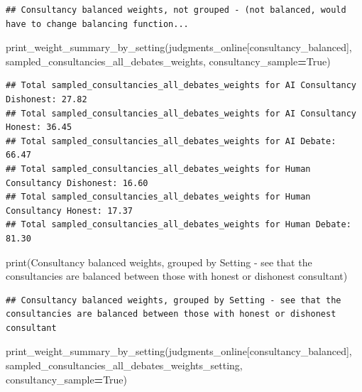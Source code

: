 \documentclass[
]{article}
\newenvironment{Shaded}{\begin{snugshade}}{\end{snugshade}}
\newcommand{\BuiltInTok}[1]{#1}
\newcommand{\NormalTok}[1]{#1}
\newcommand{\OperatorTok}[1]{\textcolor[rgb]{0.81,0.36,0.00}{\textbf{#1}}}
\newcommand{\StringTok}[1]{\textcolor[rgb]{0.31,0.60,0.02}{#1}}
\newcommand{\VariableTok}[1]{\textcolor[rgb]{0.00,0.00,0.00}{#1}}
\begin{document}
\begin{verbatim}
## Consultancy balanced weights, not grouped - (not balanced, would have to change balancing function...
\end{verbatim}

\begin{Shaded}
\begin{Highlighting}[]
\NormalTok{print\_weight\_summary\_by\_setting(judgments\_online[consultancy\_balanced], }\StringTok{\textquotesingle{}sampled\_consultancies\_all\_debates\_weights\textquotesingle{}}\NormalTok{, consultancy\_sample}\OperatorTok{=}\VariableTok{True}\NormalTok{)}
\end{Highlighting}
\end{Shaded}

\begin{verbatim}
## Total sampled_consultancies_all_debates_weights for AI Consultancy Dishonest: 27.82
## Total sampled_consultancies_all_debates_weights for AI Consultancy Honest: 36.45
## Total sampled_consultancies_all_debates_weights for AI Debate: 66.47
## Total sampled_consultancies_all_debates_weights for Human Consultancy Dishonest: 16.60
## Total sampled_consultancies_all_debates_weights for Human Consultancy Honest: 17.37
## Total sampled_consultancies_all_debates_weights for Human Debate: 81.30
\end{verbatim}

\begin{Shaded}
\begin{Highlighting}[]
\BuiltInTok{print}\NormalTok{(}\StringTok{\textquotesingle{}Consultancy balanced weights, grouped by Setting {-} see that the consultancies are balanced between those with honest or dishonest consultant\textquotesingle{}}\NormalTok{)}
\end{Highlighting}
\end{Shaded}

\begin{verbatim}
## Consultancy balanced weights, grouped by Setting - see that the consultancies are balanced between those with honest or dishonest consultant
\end{verbatim}

\begin{Shaded}
\begin{Highlighting}[]
\NormalTok{print\_weight\_summary\_by\_setting(judgments\_online[consultancy\_balanced], }\StringTok{\textquotesingle{}sampled\_consultancies\_all\_debates\_weights\_setting\textquotesingle{}}\NormalTok{, consultancy\_sample}\OperatorTok{=}\VariableTok{True}\NormalTok{)}
\end{Highlighting}
\end{Shaded}
\end{document}
